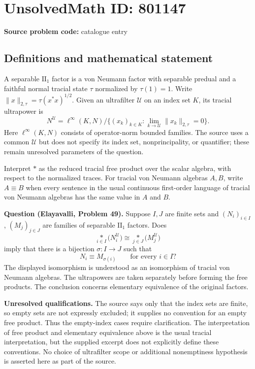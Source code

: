 \documentclass[11pt]{article}
\begin{document}
\section*{UnsolvedMath ID: 801147}
\textbf{Source problem code:} catalogue entry
\subsection{Definitions and mathematical statement}
A separable \(\mathrm{II}_1\) factor is a von Neumann factor with separable predual and a faithful normal tracial state \(\tau\) normalized by \(\tau(1)=1\). Write \(\|x\|_{2,\tau}=\tau(x^*x)^{1/2}\). Given an ultrafilter \(\mathcal U\) on an index set \(K\), its tracial ultrapower is
\[
N^{\mathcal U}=\ell^\infty(K,N)\big/\{(x_k)_{k\in K}:\lim_{k\to\mathcal U}\|x_k\|_{2,\tau}=0\}.
\]
Here \(\ell^\infty(K,N)\) consists of operator-norm bounded families. The source uses a common \(\mathcal U\) but does not specify its index set, nonprincipality, or quantifier; these remain unresolved parameters of the question.

Interpret \(\ast\) as the reduced tracial free product over the scalar algebra, with respect to the normalized traces. For tracial von Neumann algebras \(A,B\), write \(A\equiv B\) when every sentence in the usual continuous first-order language of tracial von Neumann algebras has the same value in \(A\) and \(B\).

\textbf{Question (Elayavalli, Problem 49).} Suppose \(I,J\) are finite sets and \((N_i)_{i\in I}\), \((M_j)_{j\in J}\) are families of separable \(\mathrm{II}_1\) factors. Does
\[
\underset{i\in I}{\ast}\bigl(N_i^{\mathcal U}\bigr)
\cong
\underset{j\in J}{\ast}\bigl(M_j^{\mathcal U}\bigr)
\]
imply that there is a bijection \(\sigma:I\to J\) such that
\[
N_i\equiv M_{\sigma(i)}\qquad\text{for every }i\in I?
\]
The displayed isomorphism is understood as an isomorphism of tracial von Neumann algebras. The ultrapowers are taken separately before forming the free products. The conclusion concerns elementary equivalence of the original factors.

\textbf{Unresolved qualifications.} The source says only that the index sets are finite, so empty sets are not expressly excluded; it supplies no convention for an empty free product. Thus the empty-index cases require clarification. The interpretation of free product and elementary equivalence above is the usual tracial interpretation, but the supplied excerpt does not explicitly define these conventions. No choice of ultrafilter scope or additional nonemptiness hypothesis is asserted here as part of the source.
\end{document}
